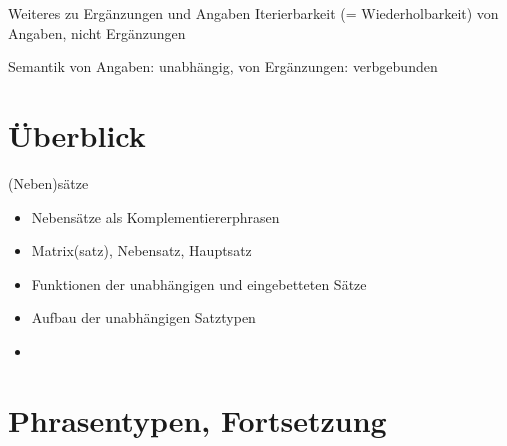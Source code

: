 \begin{frame}
  {Weiteres zu Ergänzungen und Angaben}
  \pause
  \alert{Iterierbarkeit} (= Wiederholbarkeit) von Angaben, nicht Ergänzungen\\
  \pause
  \Halbzeile
  \begin{exe}
    \pause
    \pause
  \end{exe}
  \pause
  \Halbzeile
  Semantik von Angaben: \alert{unabhängig}, von Ergänzungen: \alert{verbgebunden}\\
  \Halbzeile
  \pause
  \begin{exe}
    \ex\label{ex:valenz071}
    \begin{xlist}
      \pause
      \pause
    \end{xlist}
  \end{exe}
\end{frame}

\section{Überblick}

\begin{frame}
  {(Neben)sätze}
  \pause
  \begin{itemize}[<+->]
    \item Nebensätze als Komplementiererphrasen
    \Halbzeile
    \item Matrix(satz), Nebensatz, Hauptsatz
    \item Funktionen der unabhängigen und eingebetteten Sätze 
    \item Aufbau der unabhängigen Satztypen
    \Halbzeile
    \item {}
  \end{itemize}

\end{frame}


\section{Phrasentypen, Fortsetzung}

